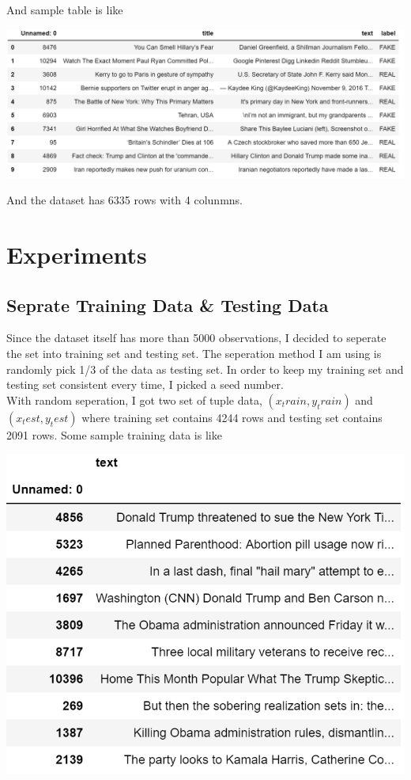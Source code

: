 \documentclass[twoside,twocolumn]{article}
\begin{document}
    \noindent And sample table is like

    \noindent \includegraphics[scale=0.4]{data_table.png}

    \noindent And the dataset has 6335 rows with 4 colunmns.


    \section{Experiments}
    
    \subsection{Seprate Training Data \& Testing Data}
    Since the dataset itself has more than 5000 observations, I decided to seperate
    the set into training set and testing set. The seperation method I am using is randomly pick 1/3 of the 
    data as testing set. In order to keep my training set and testing set consistent every time, I picked a 
    seed number.
    \\ With random seperation, I got two set of tuple data, $(x_train, y_train)$
    and $(x_test, y_test)$ where training set contains 4244 rows and testing set
    contains 2091 rows. Some sample training data is like
    
    \noindent \includegraphics[scale=0.8]{train_data.png}
    
\end{document}

